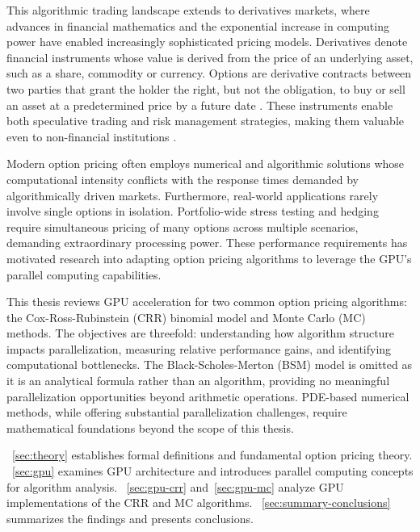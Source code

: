 \documentclass[english,12pt,a4paper,pdftex,sci,utf8]{aaltothesis}
\begin{document}
This algorithmic trading landscape extends to derivatives markets, where advances in financial mathematics \cite{merton1994influence} and the exponential increase in computing power \cite{nordhaus2007two} have enabled increasingly sophisticated pricing models. Derivatives denote financial instruments whose value is derived from the price of an underlying asset, such as a share, commodity or currency. Options are derivative contracts between two parties that grant the holder the right, but not the obligation, to buy or sell an asset at a predetermined price by a future date \cite{hull2018}. These instruments enable both speculative trading and risk management strategies, making them valuable even to non-financial institutions \cite{bartram2009international}.

Modern option pricing often employs numerical and algorithmic solutions whose computational intensity conflicts with the response times demanded by algorithmically driven markets. Furthermore, real-world applications rarely involve single options in isolation. Portfolio-wide stress testing and hedging require simultaneous pricing of many options across multiple scenarios, demanding extraordinary processing power. These performance requirements has motivated research into adapting option pricing algorithms to leverage the GPU's parallel computing capabilities.

This thesis reviews GPU acceleration for two common option pricing algorithms: the Cox-Ross-Rubinstein (CRR) binomial model and Monte Carlo (MC) methods. The objectives are threefold: understanding how algorithm structure impacts parallelization, measuring relative performance gains, and identifying computational bottlenecks. The Black-Scholes-Merton (BSM) model is omitted as it is an analytical formula rather than an algorithm, providing no meaningful parallelization opportunities beyond arithmetic operations. PDE-based numerical methods, while offering substantial parallelization challenges, require mathematical foundations beyond the scope of this thesis.

~\cref{sec:theory} establishes formal definitions and fundamental option pricing theory. ~\cref{sec:gpu} examines GPU architecture and introduces parallel computing concepts for algorithm analysis. ~\cref{sec:gpu-crr} and~\cref{sec:gpu-mc} analyze GPU implementations of the CRR and MC algorithms. ~\cref{sec:summary-conclusions} summarizes the findings and presents conclusions.
\end{document}
